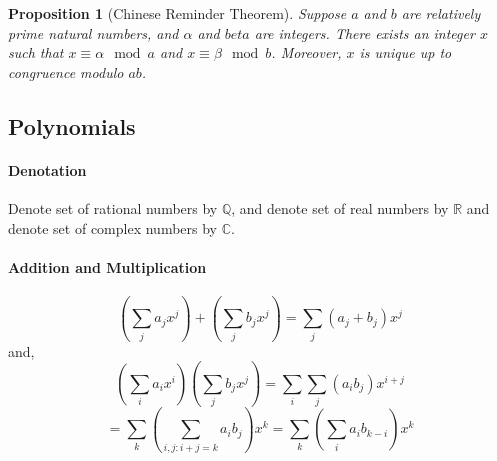 \documentclass[12pt]{article}
\newtheorem{proposition}{Proposition}[subsection]
\begin{document}
    \begin{proposition}[Chinese Reminder Theorem]
        Suppose $a$ and $b$ are relatively prime natural numbers, and $\alpha$ and $beta$ are integers. There exists an integer $x$ such that $x \equiv \alpha \mod a$ and $x \equiv \beta \mod b$. Moreover, $x$ is unique up to congruence modulo $ab$.
    \end{proposition}

\subsection{Polynomials}
    \paragraph{Denotation} Denote set of rational numbers by $\mathbb{Q}$, and denote set of real numbers by $\mathbb{R}$ and denote set of complex numbers by $\mathbb{C}$.
    \paragraph{Addition and Multiplication}
    \begin{equation}
        (\sum_j a_jx^j)+(\sum_j b_jx^j) = \sum_j(a_j+b_j)x^j
    \end{equation}
    and,
    \begin{equation}
        (\sum_i a_ix^i)(\sum_j b_jx^j) = \sum_i\sum_j(a_ib_j)x^{i+j}
    \end{equation}
    \begin{equation}
        =\sum_k(\sum_{i,j:i+j=k}a_ib_j)x^k = \sum_k(\sum_i a_ib_{k-i})x^k
    \end{equation}
\end{document}
